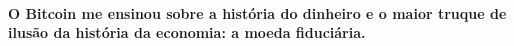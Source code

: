 \paragraph{O Bitcoin me ensinou sobre a história do dinheiro e o maior truque de ilusão da história da economia: a moeda fiduciária.}

%
%
%
%
